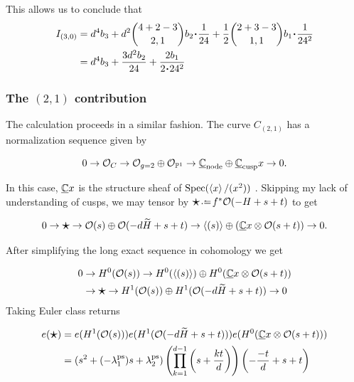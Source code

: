 \documentclass[12pt]{memoir}
\begin{document}
This allows us to conclude that
\begin{align*}
    I_{(3,0)} & =d^4b_3+d^2\binom{4+2-3}{2,1}b_2\.\frac{1}{24}+\frac{1}{2}\binom{2+3-3}{1,1}b_1\.\frac{1}{24^2} \\
              & =d^4b_3+\frac{3d^2b_2}{24}+\frac{2b_1}{2\.24^2}
\end{align*}

\subsubsection{The \((2,1)\) contribution}

The calculation proceeds in a similar fashion. The curve \(C_{(2,1)}\) has a normalization sequence given by


\[0\to\mathcal{O}_C\to \mathcal{O}_{g=2}\oplus\mathcal{O}_{\mathbb{P}^1}\to\underline{\mathbb{C}}_{\text{node}}\oplus\underline{\mathbb{C}}_{\text{cusp}}x\to 0.\]
\par
In this case, \(\underline{\mathbb{C}}x\) is the structure sheaf of \(\operatorname{Spec}(\left\langle x\right\rangle/(x^2))\) . Skipping my lack of understanding of cusps, we may tensor by \({\raisebox{-0.08em}{\scalebox{1.5}{\ensuremath\star}}}\defeq f^\ast\cO(-H+s+t)\) to get

\[0\to {\raisebox{-0.08em}{\scalebox{1.5}{\ensuremath\star}}}\to \cO(s)\oplus\cO(-d\widetilde{H}+s+t)\to\genr{(s)}\oplus(\un{\bC}x\ox\cO(s+t))\to 0.
\]

After simplifying the long exact sequence in cohomology we get

\begin{align*}
    0 & \to H^0(\cO(s))\to H^0(\genr{(s)})\oplus H^0(\un{\bC}x\ox\cO(s+t))                                                  \\
      & \to {\raisebox{-0.08em}{\scalebox{1.5}{\ensuremath\star}}}\to H^1(\cO(s))\oplus H^1(\cO(-d\widetilde{H}+s+t)) \to 0
\end{align*}
Taking Euler class returns

\begin{align*}
    e({\raisebox{-0.08em}{\scalebox{1.5}{\ensuremath\star}}}) & =e(H^1(\cO(s)))e(H^1(\cO(-d\widetilde{H}+s+t)))e(H^0(\un{\bC}x\ox\cO(s+t)))                                               \\
                                                              & =(s^2+(-\la_1^{\ps})s+\la_2^{\ps})\left(\prod_{k=1}^{d-1}\left(s+\frac{kt}{d}\right)\right)\left(-\frac{-t}{d}+s+t\right) \\
\end{align*}
\end{document}
